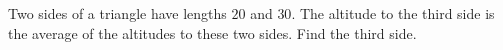 Two sides of a triangle have lengths $20$ and $30$. The altitude to the third side is the average of the altitudes to these two sides. Find the third side.
